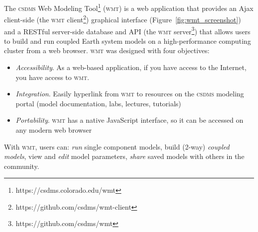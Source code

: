 \documentclass[11pt, oneside]{amsart}
\DeclareRobustCommand{\csdms}{\textsc{csdms}}
\DeclareRobustCommand{\wmt}{\textsc{wmt}}
\begin{document}
The \csdms{} Web Modeling Tool\footnote{https://csdms.colorado.edu/wmt}
(\wmt{}) is a web
application that provides an Ajax client-side (the \wmt{}
client\footnote{https://github.com/csdms/wmt-client}) graphical interface
(Figure~\ref{fig:wmt_screenshot}) and a RESTful
server-side database and API (the \wmt{} server\footnote{https://github.com/csdms/wmt}) that allows users to build and run coupled Earth system models on
a high-performance computing cluster from a web browser. \wmt{} was designed
with four objectives:
\begin{itemize}

\item \emph{Accessibility}. As a web-based application, if you have access
      to the Internet, you have access to \wmt{}.

\item \emph{Integration}. Easily hyperlink from \wmt{} to resources on the 
      \csdms{} modeling portal (model documentation, labs, lectures,
      tutorials)

\item \emph{Portability}. \wmt{} has a native JavaScript interface, so it can
      be accessed on any modern web browser


\end{itemize}
With \wmt{}, users can: \emph{run} single component models, build (2-way)
\emph{coupled models}, view and \emph{edit} model parameters, \emph{share}
saved models with others in the community.

\end{document}
